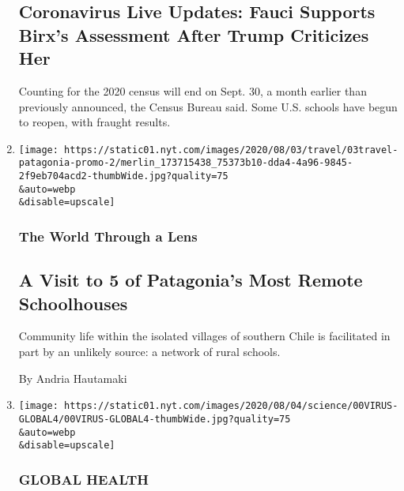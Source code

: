 \begin{enumerate}
  \hypertarget{coronavirus-live-updates-fauci-supports-birxs-assessment-after-trump-criticizes-her}{%
  \subsection{Coronavirus Live Updates: Fauci Supports Birx's Assessment
  After Trump Criticizes
  Her}\label{coronavirus-live-updates-fauci-supports-birxs-assessment-after-trump-criticizes-her}}

  Counting for the 2020 census will end on Sept. 30, a month earlier
  than previously announced, the Census Bureau said. Some U.S. schools
  have begun to reopen, with fraught results.
\item
  \href{/2020/08/03/travel/remote-schools-patagonia.html}{}

  \texttt{[image: https://static01.nyt.com/images/2020/08/03/travel/03travel-patagonia-promo-2/merlin\_173715438\_75373b10-dda4-4a96-9845-2f9eb704acd2-thumbWide.jpg?quality=75\\\&auto=webp\\\&disable=upscale]}

  \hypertarget{the-world-through-a-lens}{%
  \subsubsection{The World Through a
  Lens}\label{the-world-through-a-lens}}

  \hypertarget{a-visit-to-5-of-patagonias-most-remote-schoolhouses}{%
  \subsection{A Visit to 5 of Patagonia's Most Remote
  Schoolhouses}\label{a-visit-to-5-of-patagonias-most-remote-schoolhouses}}

  Community life within the isolated villages of southern Chile is
  facilitated in part by an unlikely source: a network of rural schools.

  By Andria Hautamaki
\item
  \href{/2020/08/03/health/coronavirus-tuberculosis-aids-malaria.html}{}

  \texttt{[image: https://static01.nyt.com/images/2020/08/04/science/00VIRUS-GLOBAL4/00VIRUS-GLOBAL4-thumbWide.jpg?quality=75\\\&auto=webp\\\&disable=upscale]}

  \hypertarget{global-health}{%
  \subsubsection{GLOBAL HEALTH}\label{global-health}}


\end{enumerate}
